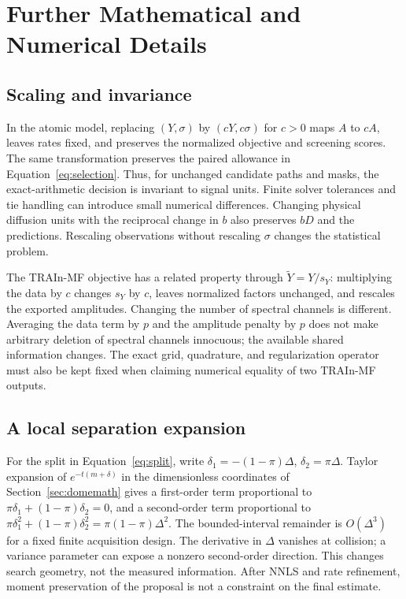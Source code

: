 \section{Further Mathematical and Numerical Details}
\subsection{Scaling and invariance}
In the atomic model, replacing $(Y,\sigma)$ by $(cY,c\sigma)$ for $c>0$ maps $A$ to $cA$, leaves rates fixed, and preserves the normalized objective and screening scores. The same transformation preserves the paired allowance in Equation~\eqref{eq:selection}. Thus, for unchanged candidate paths and masks, the exact-arithmetic decision is invariant to signal units. Finite solver tolerances and tie handling can introduce small numerical differences. Changing physical diffusion units with the reciprocal change in $b$ also preserves $bD$ and the predictions. Rescaling observations without rescaling $\sigma$ changes the statistical problem.

The TRAIn-MF objective has a related property through $\widetilde Y=Y/s_Y$: multiplying the data by $c$ changes $s_Y$ by $c$, leaves normalized factors unchanged, and rescales the exported amplitudes. Changing the number of spectral channels is different. Averaging the data term by $p$ and the amplitude penalty by $p$ does not make arbitrary deletion of spectral channels innocuous; the available shared information changes. The exact grid, quadrature, and regularization operator must also be kept fixed when claiming numerical equality of two TRAIn-MF outputs.

\subsection{A local separation expansion}
For the split in Equation~\eqref{eq:split}, write $\delta_1=-(1-\pi)\Delta$, $\delta_2=\pi\Delta$. Taylor expansion of $e^{-t(m+\delta)}$ in the dimensionless coordinates of Section~\ref{sec:domemath} gives a first-order term proportional to $\pi\delta_1+(1-\pi)\delta_2=0$, and a second-order term proportional to $\pi\delta_1^2+(1-\pi)\delta_2^2=\pi(1-\pi)\Delta^2$. The bounded-interval remainder is $O(\Delta^3)$ for a fixed finite acquisition design. The derivative in $\Delta$ vanishes at collision; a variance parameter can expose a nonzero second-order direction. This changes search geometry, not the measured information. After NNLS and rate refinement, moment preservation of the proposal is not a constraint on the final estimate.

